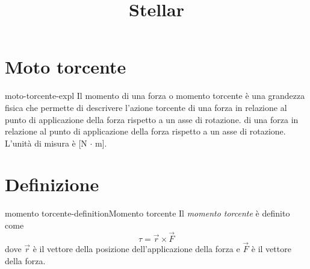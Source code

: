 \documentclass[preview]{standalone}
\begin{document}
\title{Stellar}
\genpage

\section{Moto torcente}

\begin{snippet}{moto-torcente-expl}
    Il momento di una forza o momento torcente è una grandezza fisica che permette di descrivere l'azione torcente di una forza in relazione al punto di applicazione della forza rispetto a un asse di rotazione.
di una forza in relazione al punto di applicazione della forza rispetto a un asse di rotazione.
\\ L'unità di misura è [N \(\cdot\) m].
\end{snippet}

\section{Definizione}

\begin{snippetdefinition}{momento torcente-definition}{Momento torcente}
    Il \textit{momento torcente} è definito come
    \[ \tau = \vec{r} \times \vec{F} \]
    dove \(\vec{r}\) è il vettore della posizione dell'applicazione della forza
    e \(\vec{F}\) è il vettore della forza.
\end{snippetdefinition}
\end{document}
